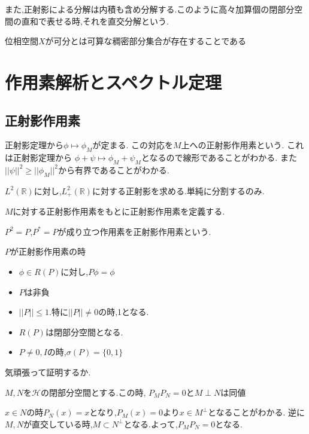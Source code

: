 \documentclass[uplatex]{jsbook}
\begin{document}
また,正射影による分解は内積も含め分解する.このように高々加算個の閉部分空間の直和で表せる時,それを$\textbf{直交分解}$という.


\begin{screen}
\begin{dfn}
 位相空間$X$が可分とは可算な稠密部分集合が存在することである
\end{dfn}
\end{screen}

\chapter{作用素解析とスペクトル定理}
\section{正射影作用素}
正射影定理から$\phi \mapsto \phi_M$が定まる.
この対応を$M$上への正射影作用素という.
これは正射影定理から
$\phi + \psi \mapsto \phi_M + \psi_M$となるので線形であることがわかる.
また$||\psi||^2 \ge ||\phi_M||^2$から有界であることがわかる.

\begin{epl}
  $L^2(\mathbb{R})$に対し,$L^2_+(\mathbb{R})$に対する正射影を求める.単純に分割するのみ.
\end{epl}

$M$に対する正射影作用素をもとに正射影作用素を定義する.
\begin{screen}
\begin{dfn}
 $P^2 = P$,$P^* = P$が成り立つ作用素を正射影作用素という.
\end{dfn}
\end{screen}

\begin{prop}
$P$が正射影作用素の時
 \begin{itemize}
   \item $\phi \in R(P)$に対し,$P\phi = \phi$
   \item $P$は非負
   \item $||P|| \le 1$.特に$||P|| \neq 0$の時,1となる.
   \item $R(P)$は閉部分空間となる.
   \item $P \neq 0, I$の時,$\sigma(P) = \{0, 1\}$
 \end{itemize}
\end{prop}
気頑張って証明するか.

\begin{prop}
$M, N$を$\mathcal{H}$の閉部分空間とする.この時,
$P_M P_N = 0$と$M \perp N$は同値
\end{prop}
$x \in N$の時$P_N(x) = x$となり,$P_M(x) = 0$より$x \in M^{\perp}$となることがわかる.
逆に$M, N$が直交している時,$M \subset N^{\perp}$となる.よって,$P_MP_N = 0$となる.
\end{document}
